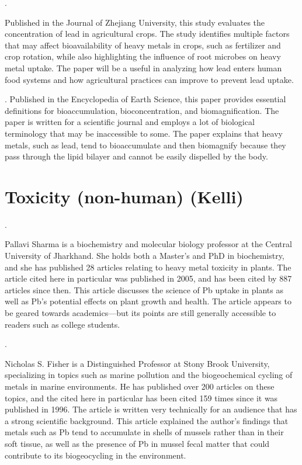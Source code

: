 \documentclass{article}
\begin{document}
\bigskip

.

\bigskip
Published in the Journal of Zhejiang University, this study evaluates the concentration of lead in agricultural crops. The study identifies multiple factors that may affect bioavailability of heavy metals in crops, such as fertilizer and crop rotation, while also highlighting the influence of root microbes on heavy metal uptake. The paper will be a useful in analyzing how lead enters human food systems and how agricultural practices can improve to prevent lead uptake. 
\bigskip

.
Published in the Encyclopedia of Earth Science, this paper provides essential definitions for bioaccumulation, bioconcentration, and biomagnification. The paper is written for a scientific journal and employs a lot of biological terminology that may be inaccessible to some. The paper explains that heavy metals, such as lead, tend to bioaccumulate and then biomagnify because they pass through the lipid bilayer and cannot be easily dispelled by the body. 


\section{Toxicity (non-human) (Kelli)}

. 
\bigskip

Pallavi Sharma is a biochemistry and molecular biology professor at the Central University of Jharkhand. She holds both a Master's and PhD in biochemistry, and she has published 28 articles relating to heavy metal toxicity in plants. The article cited here in particular was published in 2005, and has been cited by 887 articles since then. 
This article discusses the science of Pb uptake in plants as well as Pb's potential effects on plant growth and health. The article appears to be geared towards academics—but its points are still generally accessible to readers such as college students. 

\bigskip 

.
\bigskip

Nicholas S. Fisher is a Distinguished Professor at Stony Brook University, specializing in topics such as marine pollution and the biogeochemical cycling of metals in marine environments. He has published over 200 articles on these topics, and the cited here in particular has been cited 159 times since it was published in 1996. The article is written very technically for an audience that has a strong scientific background. This article explained the author's findings that metals such as Pb tend to accumulate in shells of mussels rather than in their soft tissue, as well as the presence of Pb in mussel fecal matter that could contribute to its biogeocycling in the environment.  
\end{document}
